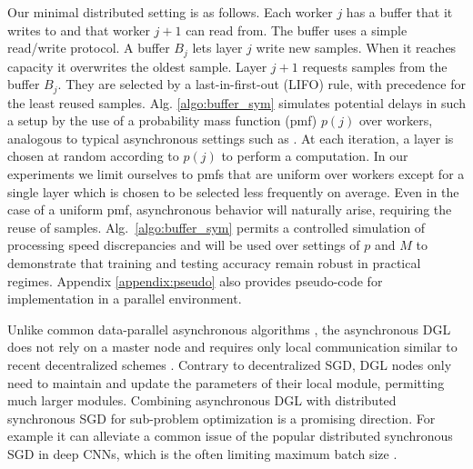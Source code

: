 \documentclass{article}
\begin{document}


\fi



Our minimal distributed setting is as follows. Each worker $j$ has a buffer that it writes to and that worker $j+1$ can read from. The buffer uses a simple read/write protocol. A buffer $B_j$ lets layer $j$ write new samples. When it reaches capacity it overwrites the oldest sample. Layer $j+1$ requests samples from the buffer $B_j$. They are selected by a last-in-first-out (LIFO) rule, with precedence for the least reused samples. 
Alg. \ref{algo:buffer_sym} simulates potential delays in such a setup by the use of a probability mass function (pmf) $p(j)$ over workers, analogous to typical asynchronous settings such as \citep{leblond2017asaga}. At each iteration, a layer is chosen at random according to $p(j)$ to perform a computation. In our experiments we  limit ourselves to pmfs that are uniform over workers except for a single layer which is chosen to be selected less frequently on average. Even in the case of a uniform pmf, asynchronous behavior will naturally arise, requiring the reuse of samples.  Alg.~\ref{algo:buffer_sym} permits a controlled simulation of processing speed discrepancies and will be used over  settings of $p$ and $M$ to demonstrate that training and testing accuracy remain robust in practical regimes. Appendix \ref{appendix:pseudo}  also provides %
pseudo-code for implementation in a parallel environment.

Unlike common data-parallel asynchronous algorithms \citep{elasticSGD}, the asynchronous DGL does not rely on a master node and requires only local communication similar to recent decentralized schemes \citep{lian2017asynchronous}. Contrary to decentralized SGD, DGL nodes only need to maintain and update the parameters of their local module, permitting much larger modules.  
Combining asynchronous DGL with distributed synchronous SGD for sub-problem optimization is a promising direction. For example it can alleviate a common issue of the popular distributed synchronous SGD in deep CNNs, which is the often limiting maximum batch size \citep{im1hr}. 
\vspace{-3pt}
\end{document}
